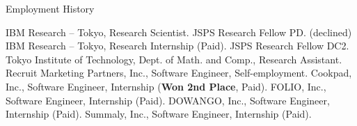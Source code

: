 \begin{rubric}{Employment History}

  \entry*[2023.04 -- now] IBM Research -- Tokyo, Research Scientist.
  \entry*[2023.04 -- 2023.4] JSPS Research Fellow PD. (declined)
  \entry*[2021.08 -- 2021.10] IBM Research -- Tokyo, Research Internship (Paid).
  \entry*[2021.04 -- 2023.3] JSPS Research Fellow DC2.
  \entry*[2020.11 -- 2023.3] Tokyo Institute of Technology, Dept. of Math. and Comp.,
  Research Assistant.
  \entry*[2018.6 -- 2019.2] Recruit Marketing Partners, Inc., Software Engineer,
  Self-employment.
  \entry*[2018.8] Cookpad, Inc., Software Engineer, Internship (\textbf{Won 2nd
    Place}, Paid).
  \entry*[2017.4 -- 2018.3] FOLIO, Inc., Software Engineer, Internship (Paid).
  \entry*[2016.8 -- 2017.3] DOWANGO, Inc., Software Engineer, Internship (Paid).
  \entry*[2016.1 -- 2016.6] Summaly, Inc., Software Engineer, Internship (Paid).
%
\end{rubric}
